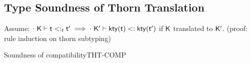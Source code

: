 \documentclass[acmlarge, anonymous, authordraft]{acmart}
\begin{document}
\subsection{Type Soundness of Thorn Translation}

Assume: $\ThorSub\cdot\K\t\tp \implies \StrSub\cdot\Kp{\kty\t}{\kty\tp}$ if ${\sf{K}}$ translated to ${{\sf{K'}}}$. (proof: rule induction on thorn subtyping)

\begin{lemma}{Soundness of compatibility}{THT-COMP}
  \begin{conds}
    \cond{$\Compatible\K\t\tp$}
    \cond{$\EnvTypeW\Env\K\e\t$}
    \cond{$\ep = \TRG{\e}\Env$}
    \cond{$\TR\K = \Kp$}
    \cond{$\TR\Env = \Envp$}
    \cond{$\EnvType\Envp\cdot\Kp{\ep}{\kty\t}$}
  \end{conds}
  \then\axiom{$\EnvType\Envp\cdot\Kp{\TAG\e\Env{\tp}}{\kty\tp}$}
\end{lemma}
\end{document}
